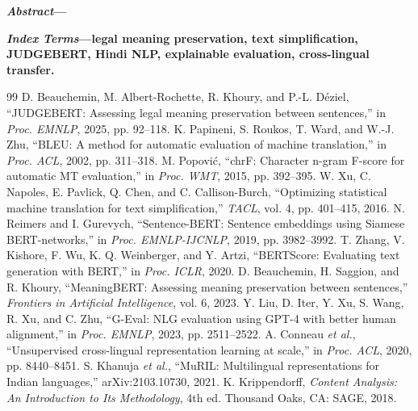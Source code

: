 \documentclass[10pt,twocolumn,a4paper]{article}
\begin{document}

\noindent\textbf{\textit{Abstract}---}

\smallskip\noindent\textbf{\textit{Index Terms}---legal meaning preservation, text simplification, JUDGEBERT, Hindi NLP, explainable evaluation, cross-lingual transfer.}




\footnotesize
\begin{thebibliography}{99}
 D. Beauchemin, M. Albert-Rochette, R. Khoury, and P.-L. Déziel, ``JUDGEBERT: Assessing legal meaning preservation between sentences,'' in \emph{Proc. EMNLP}, 2025, pp. 92--118.
 K. Papineni, S. Roukos, T. Ward, and W.-J. Zhu, ``BLEU: A method for automatic evaluation of machine translation,'' in \emph{Proc. ACL}, 2002, pp. 311--318.
 M. Popović, ``chrF: Character n-gram F-score for automatic MT evaluation,'' in \emph{Proc. WMT}, 2015, pp. 392--395.
 W. Xu, C. Napoles, E. Pavlick, Q. Chen, and C. Callison-Burch, ``Optimizing statistical machine translation for text simplification,'' \emph{TACL}, vol. 4, pp. 401--415, 2016.
 N. Reimers and I. Gurevych, ``Sentence-BERT: Sentence embeddings using Siamese BERT-networks,'' in \emph{Proc. EMNLP-IJCNLP}, 2019, pp. 3982--3992.
 T. Zhang, V. Kishore, F. Wu, K. Q. Weinberger, and Y. Artzi, ``BERTScore: Evaluating text generation with BERT,'' in \emph{Proc. ICLR}, 2020.
 D. Beauchemin, H. Saggion, and R. Khoury, ``MeaningBERT: Assessing meaning preservation between sentences,'' \emph{Frontiers in Artificial Intelligence}, vol. 6, 2023.
 Y. Liu, D. Iter, Y. Xu, S. Wang, R. Xu, and C. Zhu, ``G-Eval: NLG evaluation using GPT-4 with better human alignment,'' in \emph{Proc. EMNLP}, 2023, pp. 2511--2522.
 A. Conneau \emph{et al.}, ``Unsupervised cross-lingual representation learning at scale,'' in \emph{Proc. ACL}, 2020, pp. 8440--8451.
 S. Khanuja \emph{et al.}, ``MuRIL: Multilingual representations for Indian languages,'' arXiv:2103.10730, 2021.
 K. Krippendorff, \emph{Content Analysis: An Introduction to Its Methodology}, 4th ed. Thousand Oaks, CA: SAGE, 2018.
\end{thebibliography}
\end{document}
